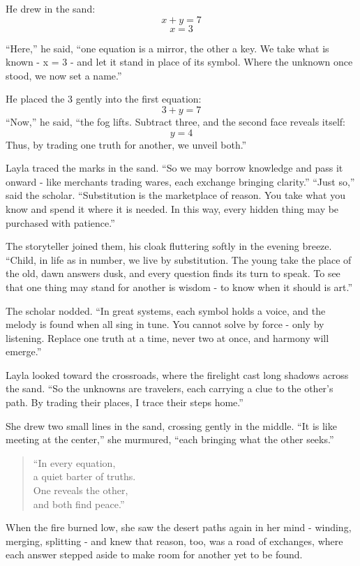 \documentclass[
  letterpaper,
  DIV=11,
  numbers=noendperiod]{scrreprt}
\begin{document}
He drew in the sand: \[
x + y = 7
\] \[
x = 3
\]

``Here,'' he said, ``one equation is a mirror, the other a key. We take
what is known - x = 3 - and let it stand in place of its symbol. Where
the unknown once stood, we now set a name.''

He placed the 3 gently into the first equation: \[
3 + y = 7
\] ``Now,'' he said, ``the fog lifts. Subtract three, and the second
face reveals itself: \[
y = 4
\] Thus, by trading one truth for another, we unveil both.''

Layla traced the marks in the sand. ``So we may borrow knowledge and
pass it onward - like merchants trading wares, each exchange bringing
clarity.'' ``Just so,'' said the scholar. ``Substitution is the
marketplace of reason. You take what you know and spend it where it is
needed. In this way, every hidden thing may be purchased with
patience.''

The storyteller joined them, his cloak fluttering softly in the evening
breeze. ``Child, in life as in number, we live by substitution. The
young take the place of the old, dawn answers dusk, and every question
finds its turn to speak. To see that one thing may stand for another is
wisdom - to know when it should is art.''

The scholar nodded. ``In great systems, each symbol holds a voice, and
the melody is found when all sing in tune. You cannot solve by force -
only by listening. Replace one truth at a time, never two at once, and
harmony will emerge.''

Layla looked toward the crossroads, where the firelight cast long
shadows across the sand. ``So the unknowns are travelers, each carrying
a clue to the other's path. By trading their places, I trace their steps
home.''

She drew two small lines in the sand, crossing gently in the middle.
``It is like meeting at the center,'' she murmured, ``each bringing what
the other seeks.''

\begin{quote}
``In every equation,\\
a quiet barter of truths.\\
One reveals the other,\\
and both find peace.''
\end{quote}

When the fire burned low, she saw the desert paths again in her mind -
winding, merging, splitting - and knew that reason, too, was a road of
exchanges, where each answer stepped aside to make room for another yet
to be found.
\end{document}
